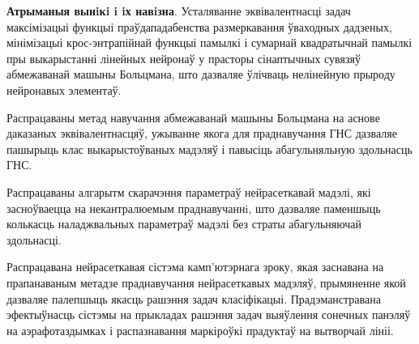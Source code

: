 \documentclass{thesisby}
\begin{document}
\textbf{Атрыманыя вынiкi i iх навiзна}.
Усталяванне эквівалентнасці задач максімізацыі функцыі пра\u{у}дападабенства размеркавання \u{у}ваходных дадзеных, мінімізацыі крос-энтрапійнай функцыі памылкі і сумарнай квадратычнай памылкі пры выкарыстанні лінейных нейрона\u{у} у прасторы сінаптычных сувязя\u{у} абмежаванай машыны Больцмана, што дазваляе \u{у}лічваць нелінейную прыроду нейронавых элемента\u{у}.

Распрацаваны метад навучання абмежаванай машыны Больцмана на аснове даказаных эквівалентнасця\u{у}, ужыванне якога для праднавучання ГНС дазваляе пашырыць клас выкарысто\u{у}ваных мадэля\u{у} і павысіць абагульняльную здольнасць ГНС.

Распрацаваны алгарытм скарачэння параметра\u{у} нейрасеткавай мадэлі, які засно\u{у}ваецца на некантралюемым праднавучаннi, што дазваляе паменшыць колькасць наладжвальных параметра\u{у} мадэлі без страты абагульняючай здольнасці.

Распрацавана нейрасеткавая сістэма камп'ютэрнага зроку, якая заснавана на прапанаваным метадзе праднавучання нейрасеткавых мадэля\u{у}, прымяненне якой дазваляе палепшыць якасць рашэння задач класіфікацыі. Прадэманстравана эфекты\u{у}насць сістэмы на прыкладах рашэння задач выя\u{у}лення сонечных панэля\u{у} на аэрафотаздымках і распазнавання маркіро\u{у}кі прадукта\u{у} на вытворчай лініі.




\end{document}
